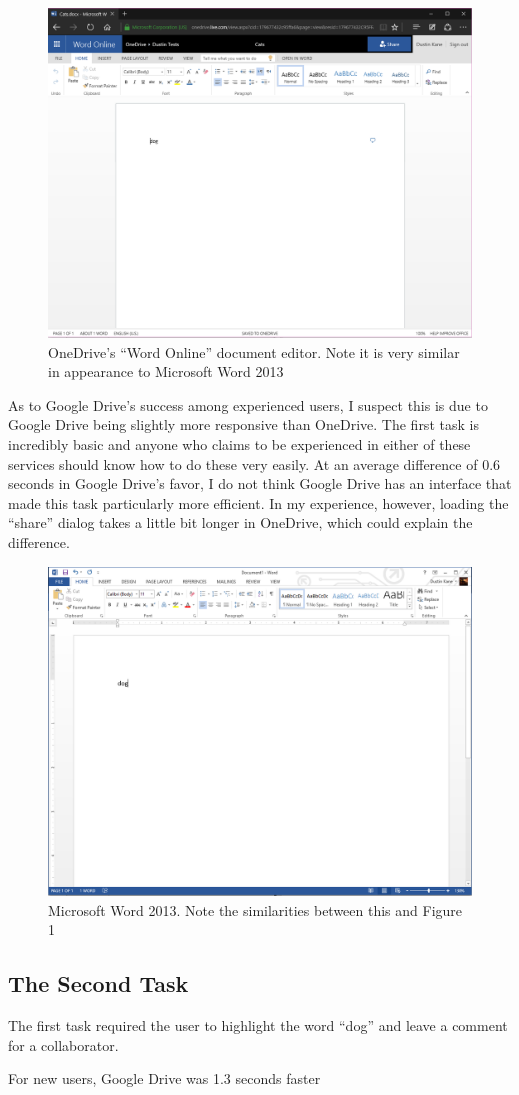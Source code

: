 \documentclass[a4paper,12pt]{article}
\begin{document}
\begin{figure}[h]
\centering
\includegraphics[width=6in]{onedrive}
\caption{OneDrive's ``Word Online'' document editor. Note it is very similar in appearance to Microsoft Word 2013}
\end{figure}

As to Google Drive's success among experienced users, I suspect this is due to Google Drive being slightly more responsive than OneDrive. The first task is incredibly basic and anyone who claims to be experienced in either of these services should know how to do these very easily. At an average difference of 0.6 seconds in Google Drive's favor, I do not think Google Drive has an interface that made this task particularly more efficient. In my experience, however, loading the ``share'' dialog takes a little bit longer in OneDrive, which could explain the difference.

\begin{figure}[h]
\centering
\includegraphics[width=6in]{word}
\caption{Microsoft Word 2013. Note the similarities between this and Figure 1}
\end{figure}

\subsection{The Second Task}

The first task required the user to highlight the word ``dog'' and leave a comment for a collaborator.

For new users, Google Drive was 1.3 seconds faster 
\end{document}

